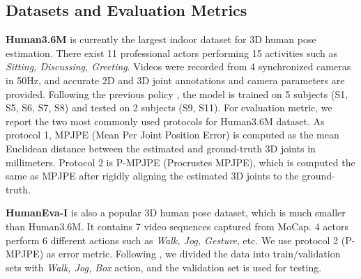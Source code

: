 \documentclass[letterpaper, 10 pt, conference]{ieeeconf}
\begin{document}
\subsection{Datasets and Evaluation Metrics}
\textbf{Human3.6M} \cite{ionescu2013human3} is currently the largest indoor dataset for 3D human pose estimation.
There exist 11 professional actors performing 15 activities such as \textit{Sitting, Discussing, Greeting}.
Videos were recorded from 4 synchronized cameras in 50Hz, and accurate 2D and 3D joint annotations and camera parameters are provided.
Following the previous policy \cite{pavllo20193d, chen2020anatomy, Liu_2020_CVPR, wang2020motion},  the model is trained on 5 subjects (S1, S5, S6, S7, S8) and tested on 2 subjects (S9, S11). 
For evaluation metric, we report the two most commonly used protocols for Human3.6M dataset.
As protocol 1, MPJPE (Mean Per Joint Position Error) is computed as the mean Euclidean distance between the estimated and ground-truth 3D joints in millimeters.
Protocol 2 is P-MPJPE (Procrustes MPJPE), which is computed the same as MPJPE after rigidly aligning the estimated 3D joints to the ground-truth.

\textbf{HumanEva-I} \cite{sigal2010humaneva} is also a popular 3D human pose dataset, which is much smaller than Human3.6M.
It contains 7 video sequences captured from MoCap.
4 actors perform 6 different actions such as \textit{Walk, Jog, Gesture}, etc.
We use protocol 2 (P-MPJPE) as error metric.
Following \cite{martinez2017simple,pavllo20193d}, we divided the data into train/validation sets with \textit{Walk, Jog, Box} action, and the validation set is used for testing.
\end{document}
